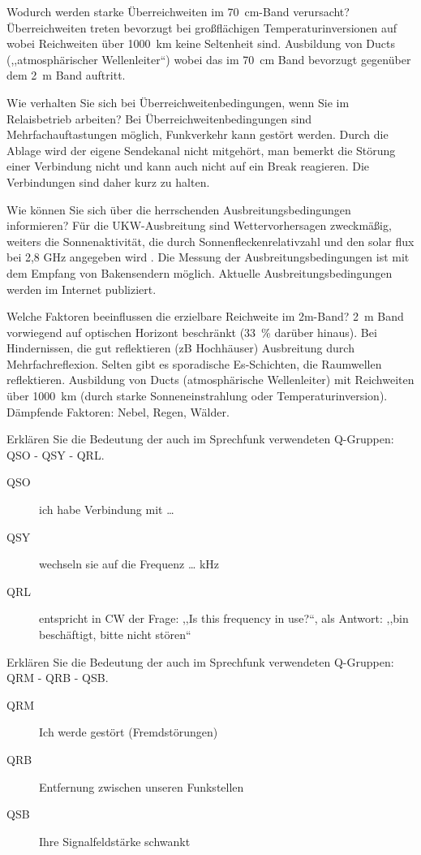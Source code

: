 \documentclass[avery5371,grid,frame,a4paper]{flashcards}
\newcommand{\card}[3]{
  \begin{flashcard}[{\chap} -- #1]{#2}#3\end{flashcard}
}
\begin{document}
\card{23}{Wodurch werden starke Überreichweiten im \SI{70}{\centi\metre}-Band verursacht?}{
  Überreichweiten treten bevorzugt bei großflächigen Temperaturinversionen auf wobei Reichweiten über 1000~km keine Seltenheit sind. Ausbildung von Ducts (,,atmosphärischer Wellenleiter``)  wobei das im \SI{70}{\centi\metre} Band bevorzugt gegenüber dem 2~m Band auftritt.
}
\card{24}{Wie verhalten Sie sich bei Überreichweitenbedingungen, wenn Sie im Relaisbetrieb arbeiten?}{
  Bei Überreichweitenbedingungen sind Mehrfachauftastungen möglich, Funkverkehr kann gestört werden. Durch die Ablage wird der eigene Sendekanal nicht mitgehört, man bemerkt die Störung einer Verbindung nicht und kann auch nicht auf ein Break reagieren. Die Verbindungen sind daher kurz zu halten.
}
\card{25}{Wie können Sie sich über die herrschenden Ausbreitungsbedingungen informieren?}{
  Für die UKW-Ausbreitung sind Wettervorhersagen zweckmäßig, weiters die Sonnenaktivität, die durch Sonnenfleckenrelativzahl und den solar flux bei 2,8 GHz angegeben wird .  Die Messung der Ausbreitungsbedingungen ist mit dem Empfang von Bakensendern möglich. Aktuelle Ausbreitungsbedingungen werden im Internet publiziert.
}
\card{26}{Welche Faktoren beeinflussen die erzielbare Reichweite im 2m-Band?}{
  2~m Band vorwiegend auf optischen Horizont beschränkt (\SI{+33}{\percent} darüber hinaus). Bei Hindernissen, die gut reflektieren (zB Hochhäuser) Ausbreitung durch Mehrfachreflexion. Selten gibt es sporadische Es-Schichten, die Raumwellen reflektieren. Ausbildung von Ducts (atmosphärische Wellenleiter) mit Reichweiten über 1000~km (durch starke Sonneneinstrahlung oder Temperaturinversion). Dämpfende Faktoren: Nebel, Regen, Wälder. 
}
\card{27}{Erklären Sie die Bedeutung der auch im Sprechfunk verwendeten Q-Gruppen: QSO - QSY - QRL.}{
  \begin{description}
    \item[QSO] ich habe Verbindung mit \dots
    \item[QSY] wechseln sie auf die Frequenz \dots{} kHz
    \item[QRL]
      entspricht in CW der Frage: ,,Is this frequency in use?{}``,
      als Antwort: ,,bin beschäftigt, bitte nicht stören``
  \end{description}
}
\card{28}{Erklären Sie die Bedeutung der auch im Sprechfunk verwendeten Q-Gruppen: QRM - QRB - QSB.}{
  \begin{description}
    \item[QRM] Ich werde gestört (Fremdstörungen)
    \item[QRB] Entfernung zwischen unseren Funkstellen
    \item[QSB] Ihre Signalfeldstärke schwankt
  \end{description}
}
\end{document}
